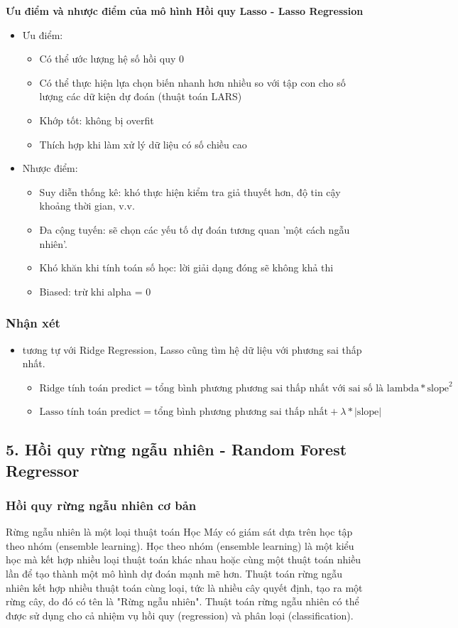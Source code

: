 \documentclass{article}
\begin{document}
	\textbf{Ưu điểm và nhược điểm của mô hình Hồi quy Lasso - Lasso Regression}
	\begin{itemize}
		\item Ưu điểm:
		\begin{itemize}
			\item Có thể ước lượng hệ số hồi quy 0
			\item Có thể thực hiện lựa chọn biến nhanh hơn nhiều so với tập con cho số lượng các dữ kiện dự đoán (thuật toán LARS)
			\item Khớp tốt: không bị overfit
			\item Thích hợp khi làm xử lý dữ liệu có số chiều cao
		\end{itemize}
		\item Nhược điểm:
		\begin{itemize}
			\item Suy diễn thống kê: khó thực hiện kiểm tra giả thuyết hơn, độ tin cậy
			khoảng thời gian, v.v.
			\item Đa cộng tuyến: sẽ chọn các yếu tố dự đoán tương quan 'một cách ngẫu nhiên'.
			\item Khó khăn khi tính toán số học: lời giải dạng đóng sẽ không khả thi
			\item Biased: trừ khi alpha = 0
		\end{itemize}
	\end{itemize}
	\subsubsection{Nhận xét}
	\begin{itemize}
		\item  tương tự với Ridge Regression, Lasso cũng tìm hệ dữ liệu với phương sai thấp nhất.
		\begin{itemize}
			\item $\text{Ridge tính toán predict} = \text{tổng bình phương phương sai thấp nhất với sai số là lambda} * \text{slope}^2$
			\item $\text{Lasso tính toán predict} = \text{tổng bình phương phương sai thấp nhất} + \lambda * \text{|slope|}$
		\end{itemize}
	\end{itemize}
	\subsection{5. Hồi quy rừng ngẫu nhiên - Random Forest Regressor}
	\subsubsection{Hồi quy rừng ngẫu nhiên cơ bản}
	\qquad Rừng ngẫu nhiên là một loại thuật toán Học Máy có giám sát dựa trên học tập theo nhóm (ensemble learning). Học theo nhóm (ensemble learning) là một kiểu học mà kết hợp nhiều loại thuật toán khác nhau hoặc cùng một thuật toán nhiều lần để tạo thành một mô hình dự đoán mạnh mẽ hơn. Thuật toán rừng ngẫu nhiên kết hợp nhiều thuật toán cùng loại, tức là nhiều cây quyết định, tạo ra một rừng cây, do đó có tên là "Rừng ngẫu nhiên". Thuật toán rừng ngẫu nhiên có thể được sử dụng cho cả nhiệm vụ hồi quy (regression) và phân loại (classification).
	
\end{document}
